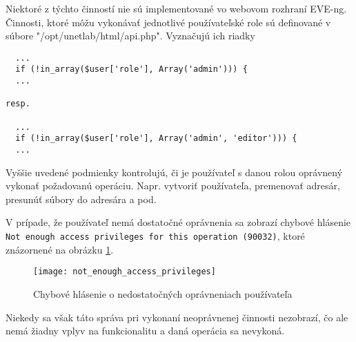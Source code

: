 Niektoré z týchto činností nie sú implementované vo webovom rozhraní EVE-ng. Činnosti, ktoré môžu vykonávať jednotlivé používateľské role sú definované v súbore "/opt/unetlab/html/api.php". Vyznačujú ich riadky

\begin{verbatim}
  ...
  if (!in_array($user['role'], Array('admin'))) {
  ...

resp.

  ...
  if (!in_array($user['role'], Array('admin', 'editor'))) {
  ...
\end{verbatim}

Vyššie uvedené podmienky kontrolujú, či je používateľ s danou rolou oprávnený vykonať požadovanú operáciu. Napr. vytvoriť používateľa, premenovať adresár, presunúť súbory do adresára a pod.

V prípade, že používateľ nemá dostatočné oprávnenia sa zobrazí chybové hlásenie \texttt{Not enough access privileges for this operation (90032)}, ktoré znázornené na obrázku \ref{obr:not_enough_access_privileges}.

\begin{figure}
    \centering
    \texttt{[image: not\_enough\_access\_privileges]}
    \caption{Chybové hlásenie o nedostatočných oprávneniach používateľa}
    \label{obr:not_enough_access_privileges}
\end{figure}

Niekedy sa však táto správa pri vykonaní neoprávnenej činnosti nezobrazí, čo ale nemá žiadny vplyv na funkcionalitu a daná operácia sa nevykoná.